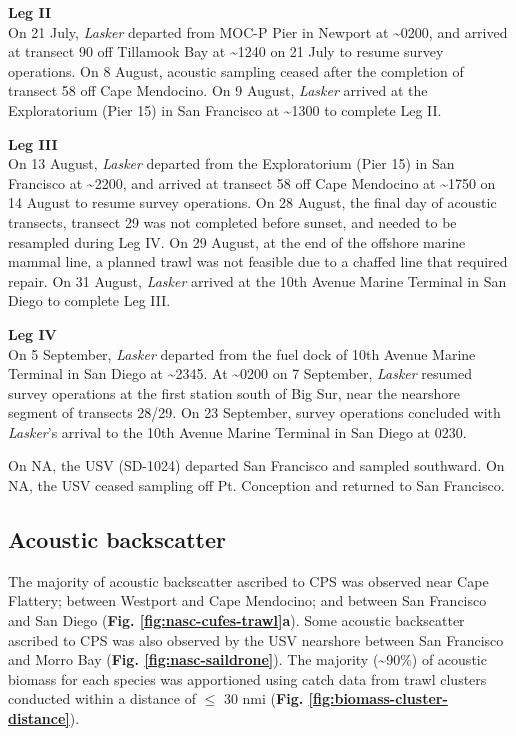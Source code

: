 \documentclass[]{article}
\begin{document}
\textbf{Leg II}\\
On 21 July, \emph{Lasker} departed from MOC-P Pier in Newport at \textasciitilde0200, and arrived at transect 90 off Tillamook Bay at \textasciitilde1240 on 21 July to resume survey operations. On 8 August, acoustic sampling ceased after the completion of transect 58 off Cape Mendocino. On 9 August, \emph{Lasker} arrived at the Exploratorium (Pier 15) in San Francisco at \textasciitilde1300 to complete Leg II.

\textbf{Leg III}\\
On 13 August, \emph{Lasker} departed from the Exploratorium (Pier 15) in San Francisco at \textasciitilde2200, and arrived at transect 58 off Cape Mendocino at \textasciitilde1750 on 14 August to resume survey operations. On 28 August, the final day of acoustic transects, transect 29 was not completed before sunset, and needed to be resampled during Leg IV. On 29 August, at the end of the offshore marine mammal line, a planned trawl was not feasible due to a chaffed line that required repair. On 31 August, \emph{Lasker} arrived at the 10th Avenue Marine Terminal in San Diego to complete Leg III.

\textbf{Leg IV}\\
On 5 September, \emph{Lasker} departed from the fuel dock of 10th Avenue Marine Terminal in San Diego at \textasciitilde2345. At \textasciitilde0200 on 7 September, \emph{Lasker} resumed survey operations at the first station south of Big Sur, near the nearshore segment of transects 28/29. On 23 September, survey operations concluded with \emph{Lasker}'s arrival to the 10th Avenue Marine Terminal in San Diego at 0230.

On NA, the USV (SD-1024) departed San Francisco and sampled southward. On NA, the USV ceased sampling off Pt. Conception and returned to San Francisco.

\hypertarget{results-backscatter-distribution}{%
\subsection{Acoustic backscatter}\label{results-backscatter-distribution}}

The majority of acoustic backscatter ascribed to CPS was observed near Cape Flattery; between Westport and Cape Mendocino; and between San Francisco and San Diego (\textbf{Fig. \ref{fig:nasc-cufes-trawl}a}). Some acoustic backscatter ascribed to CPS was also observed by the USV nearshore between San Francisco and Morro Bay (\textbf{Fig. \ref{fig:nasc-saildrone}}). The majority (\textasciitilde90\%) of acoustic biomass for each species was apportioned using catch data from trawl clusters conducted within a distance of \(\leq\) 30 nmi (\textbf{Fig. \ref{fig:biomass-cluster-distance}}).
\end{document}
